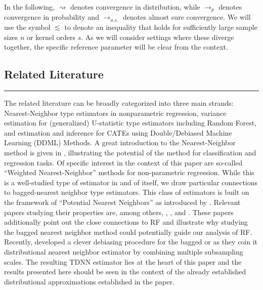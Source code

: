 In the following, $\rightsquigarrow$ denotes convergence in distribution, while
$\rightarrow_{p}$ denotes convergence in probability and $\rightarrow_{a.s.}$
denotes almost sure convergence. We will use the symbol $\lesssim$ to denote an
inequality that holds for sufficiently large sample sizes $n$ or kernel orders
$s$. As we will consider settings where these diverge together, the specific
reference parameter will be clear from the context.

\subsection{Related Literature}
\hrule
The related literature can be broadly categorized into three main strands: Nearest-Neighbor type estimators in nonparametric regression, variance estimation for (generalized) U-statistic type estimators including Random Forest, and estimation and inference for CATEs using Double/Debiased Machine Learning (DDML) Methods.
A great introduction to the Nearest-Neighbor method is given in \citet{biau_lectures_2015}, illustrating the potential of the method for classification and regression tasks.
Of specific interest in the context of this paper are so-called ``Weighted Nearest-Neighbor'' methods for non-parametric regression.
While this is a well-studied type of estimator in and of itself, we draw particular connections to bagged-nearest neighbor type estimators.
This class of estimators is built on the framework of ``Potential Nearest Neighbors'' as introduced by \citet{lin_random_2006}.
Relevant papers studying their properties are, among others, \citet{biau_rate_2010}, \citet{biau_layered_2010}, and \citet{steele_exact_2009}.
These papers additionally point out the close connections to RF and illustrate why studying the bagged nearest neighbor method could potentially guide our analysis of RF.
Recently, \citet{demirkaya_optimal_2024} developed a clever debiasing procedure for the bagged or as they coin it distributional nearest neighbor estimator by combining multiple subsampling scales.
The resulting TDNN estimator lies at the heart of this paper and the results presented here should be seen in the context of the already established distributional approximations established in the paper.

